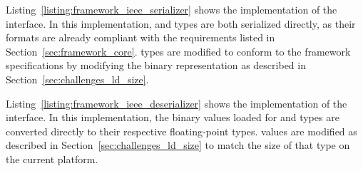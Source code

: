 Listing~\ref{listing:framework_ieee_serializer} shows the implementation of the  interface. In this implementation,  and  types are both serialized directly, as their formats are already compliant with the requirements listed in Section~\ref{sec:framework_core}.  types are modified to conform to the framework specifications by modifying the binary representation as described in Section~\ref{sec:challenges_ld_size}.

\begin{singlespace}
	
\end{singlespace}

Listing~\ref{listing:framework_ieee_deserializer} shows the implementation of the  interface. In this implementation, the binary values loaded for  and  types are converted directly to their respective floating-point types.  values are modified as described in Section~\ref{sec:challenges_ld_size} to match the size of that type on the current platform.

\begin{singlespace}
	
\end{singlespace}
